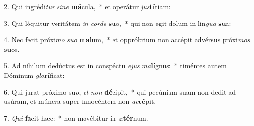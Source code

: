 2. Qui ingrédi\textit{tur} \textit{si}\textit{ne} \textbf{má}cula,~*  et operátur \textit{jus}\textbf{tí}tiam:\

3. Qui lóquitur veritátem \textit{in} \textit{cor}\textit{de} \textbf{su}o,~*  qui non egit dolum in lin\textit{gua} \textbf{su}a:\

4. Nec fecit próxi\textit{mo} \textit{su}\textit{o} \textbf{ma}lum,~*  et oppróbrium non accépit advérsus próxi\textit{mos} \textbf{su}os.\

5. Ad níhilum dedúctus est in conspéctu \textit{e}\textit{jus} \textit{ma}\textbf{lí}gnus:~*  timéntes autem Dóminum \textit{glo}\textbf{rí}ficat:\

6. Qui jurat próximo su\textit{o}, \textit{et} \textit{non} \textbf{dé}cipit,~*  qui pecúniam suam non dedit ad usúram, et múnera super innocéntem non \textit{ac}\textbf{cé}pit.\

7. \textit{Qui} \textbf{fa}cit hæc:~*  non movébitur in \textit{æ}\textbf{tér}num.\

